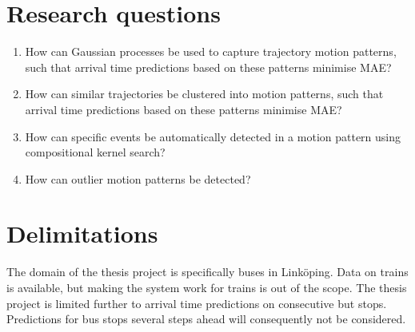 \section{Research questions}
\label{sec:research-questions}

\begin{enumerate}
\item How can Gaussian processes be used to capture trajectory motion
  patterns, such that arrival time predictions based on these patterns minimise MAE?

\item How can similar trajectories be clustered into motion patterns, 
  such that arrival time predictions based on these patterns minimise MAE? 
  
\item How can specific events be automatically detected in a
  motion pattern using compositional kernel search?

\item How can outlier motion patterns be detected?
\end{enumerate}



\section{Delimitations}
\label{sec:delimitations}
The domain of the thesis project is specifically buses in
Linköping. Data on trains is available, but making the system
work for trains is out of the scope. The thesis project is limited further
to arrival time predictions on consecutive
but stops. Predictions for bus stops several steps ahead will
consequently not be considered.

